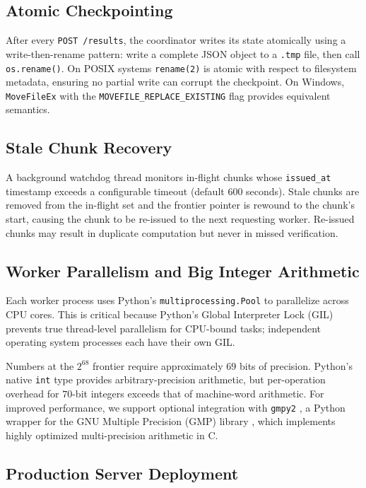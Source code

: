 \documentclass{mcom-l}
\theoremstyle{definition}
\theoremstyle{remark}
\numberwithin{equation}{section}
\begin{document}
\subsection{Atomic Checkpointing}

After every \texttt{POST /results}, the coordinator writes its state
atomically using a write-then-rename pattern: write a complete JSON
object to a \texttt{.tmp} file, then call \texttt{os.rename()}.
On POSIX systems \texttt{rename(2)} is atomic with respect to
filesystem metadata, ensuring no partial write can corrupt the
checkpoint.  On Windows, \texttt{MoveFileEx} with the
\texttt{MOVEFILE\_REPLACE\_EXISTING} flag provides equivalent
semantics.

\subsection{Stale Chunk Recovery}

A background watchdog thread monitors in-flight chunks whose
\texttt{issued\_at} timestamp exceeds a configurable timeout (default
$600$ seconds).  Stale chunks are removed from the in-flight set and
the frontier pointer is rewound to the chunk's start, causing the
chunk to be re-issued to the next requesting worker.  Re-issued chunks
may result in duplicate computation but never in missed verification.

\subsection{Worker Parallelism and Big Integer Arithmetic}

Each worker process uses Python's \texttt{multiprocessing.Pool}
\cite{PythonDocs} to parallelize across CPU cores.  This is critical
because Python's Global Interpreter Lock (GIL) prevents true
thread-level parallelism for CPU-bound tasks; independent operating
system processes each have their own GIL.

Numbers at the $2^{68}$ frontier require approximately $69$ bits of
precision.  Python's native \texttt{int} type provides
arbitrary-precision arithmetic, but per-operation overhead for
$70$-bit integers exceeds that of machine-word arithmetic.  For
improved performance, we support optional integration with
\texttt{gmpy2} \cite{gmpy2}, a Python wrapper for the GNU Multiple
Precision (GMP) library \cite{GMP}, which implements highly optimized
multi-precision arithmetic in C.

\subsection{Production Server Deployment}
\end{document}

